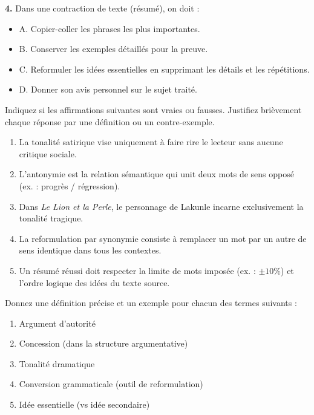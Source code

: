 \documentclass[11pt]{article}
\newcommand{\cle}[1]{{\popxbold\color{popdark}#1}}
\begin{document}
\begin{exercice}
\textbf{4.} Dans une \cle{contraction de texte} (résumé), on doit :
\begin{itemize}
    \item A. Copier-coller les phrases les plus importantes.
    \item B. Conserver les exemples détaillés pour la preuve.
    \item C. Reformuler les idées essentielles en supprimant les détails et les répétitions.
    \item D. Donner son avis personnel sur le sujet traité.
\end{itemize}
\end{exercice}

\begin{exercice}
Indiquez si les affirmations suivantes sont vraies ou fausses. Justifiez brièvement chaque réponse par une définition ou un contre-exemple.

\begin{enumerate}
    \item La \cle{tonalité satirique} vise uniquement à faire rire le lecteur sans aucune critique sociale.
    \item L'\cle{antonymie} est la relation sémantique qui unit deux mots de sens opposé (ex. : progrès / régression).
    \item Dans \emph{Le Lion et la Perle}, le personnage de Lakunle incarne exclusivement la tonalité tragique.
    \item La \cle{reformulation} par synonymie consiste à remplacer un mot par un autre de sens identique dans tous les contextes.
    \item Un résumé réussi doit respecter la limite de mots imposée (ex. : $\pm 10\%$) et l'ordre logique des idées du texte source.
\end{enumerate}
\end{exercice}

\begin{exercice}
Donnez une définition précise et un exemple pour chacun des termes suivants :
\begin{enumerate}
    \item \cle{Argument d'autorité}
    \item \cle{Concession} (dans la structure argumentative)
    \item \cle{Tonalité dramatique}
    \item \cle{Conversion grammaticale} (outil de reformulation)
    \item \cle{Idée essentielle} (vs idée secondaire)
\end{enumerate}
\end{exercice}
\end{document}

